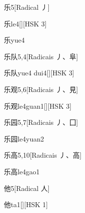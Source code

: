 \begin{entry}{乐}{5}[Radical ⼃]
  \begin{phonetics}{乐}{le4}[][HSK 3]
  \end{phonetics}
  \begin{phonetics}{乐}{yue4}
  \end{phonetics}
\end{entry}

\begin{entry}{乐队}{5,4}[Radicais ⼃、⾩]
  \begin{phonetics}{乐队}{yue4 dui4}[][HSK 3]
  \end{phonetics}
\end{entry}

\begin{entry}{乐观}{5,6}[Radicais ⼃、⾒]
  \begin{phonetics}{乐观}{le4guan1}[][HSK 3]
  \end{phonetics}
\end{entry}

\begin{entry}{乐园}{5,7}[Radicais ⼃、⼞]
  \begin{phonetics}{乐园}{le4yuan2}
  \end{phonetics}
\end{entry}

\begin{entry}{乐高}{5,10}[Radicais ⼃、⾼]
  \begin{phonetics}{乐高}{le4gao1}
  \end{phonetics}
\end{entry}

\begin{entry}{他}{5}[Radical ⼈]
  \begin{phonetics}{他}{ta1}[][HSK 1]
  \end{phonetics}
\end{entry}

